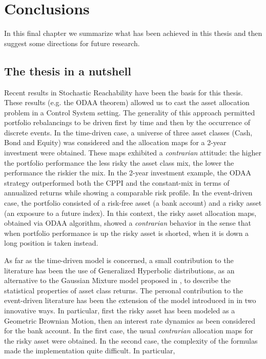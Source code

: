 \chapter{Conclusions}\label{chpt:Conclusions}
In this final chapter we summarize what has been achieved in this thesis and then suggest some directions for future research.

\section{The thesis in a nutshell}
Recent results in Stochastic Reachability have been the basis for this thesis. These results (e.g. the \gls{ODAA} theorem) allowed us to cast the asset allocation problem in a Control System setting. The generality of this approach permitted portfolio rebalancings to be driven first by time and then by the occurrence of discrete events. In the time-driven case, a universe of three asset classes (Cash, Bond and Equity) was considered and the allocation maps for a 2-year investment were obtained. These maps exhibited a \textit{contrarian} attitude: the higher the portfolio performance the less risky the asset class mix, the lower the performance the riskier the mix. In the 2-year investment example, the \gls{ODAA} strategy outperformed both the \gls{CPPI} and the constant-mix in terms of annualized returns while showing a comparable risk profile. In the event-driven case, the portfolio consisted of a risk-free asset (a bank account) and a risky asset (an exposure to a future index). In this context, the risky asset allocation maps, obtained via \gls{ODAA} algorithm, showed a \textit{contrarian} behavior in the sense that when portfolio performance is up the risky asset is shorted, when it is down a long position is taken instead.

As far as the time-driven model is concerned, a small contribution to the literature has been the use of Generalized Hyperbolic distributions, as an alternative to the Gaussian Mixture model proposed in \cite{Pola12}, to describe the statistical properties of asset class returns.
The personal contribution to the event-driven literature has been the extension of the model introduced in \cite{specchio2011} in two innovative ways. In particular, first the risky asset has been modeled as a Geometric Brownian Motion, then an interest rate dynamics as been considered for the bank account. In the first case, the usual \textit{contrarian} allocation maps for the risky asset were obtained. In the second case, the complexity of the formulas made the implementation quite difficult. In particular,
